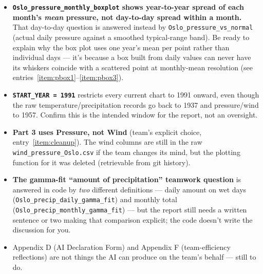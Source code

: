 \begin{itemize}[leftmargin=*]
\item \textbf{\texttt{Oslo\_pressure\_monthly\_boxplot} shows year-to-year spread of each
month's \emph{mean} pressure, not day-to-day spread within a month.} That day-to-day
question is answered instead by \texttt{Oslo\_pressure\_vs\_normal} (actual daily pressure
against a smoothed typical-range band). Be ready to explain why the box plot uses one year's
mean per point rather than individual days --- it's because a box built from daily values
can never have its whiskers coincide with a scattered point at monthly-mean resolution (see
entries~\ref{item:pbox1}--\ref{item:pbox3}).
\item \textbf{\texttt{START\_YEAR = 1991}} restricts every current chart to 1991 onward, even
though the raw temperature/precipitation records go back to 1937 and pressure/wind to 1957.
Confirm this is the intended window for the report, not an oversight.
\item \textbf{Part 3 uses Pressure, not Wind} (team's explicit choice, entry~\ref{item:cleanup}).
The wind columns are still in the raw \texttt{wind\_pressure\_Oslo.csv} if the team changes
its mind, but the plotting function for it was deleted (retrievable from git history).
\item \textbf{The gamma-fit ``amount of precipitation'' teamwork question} is answered in
code by \emph{two} different definitions --- daily amount on wet days
(\texttt{Oslo\_precip\_daily\_gamma\_fit}) and monthly total
(\texttt{Oslo\_precip\_monthly\_gamma\_fit}) --- but the report still needs a written sentence
or two making that comparison explicit; the code doesn't write the discussion for you.
\item Appendix D (AI Declaration Form) and Appendix F (team-efficiency reflections) are not
things the AI can produce on the team's behalf --- still to do.
\end{itemize}


